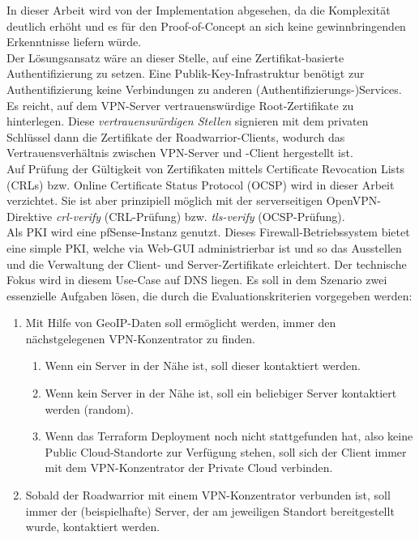 In dieser Arbeit wird von der Implementation abgesehen, da die Komplexität deutlich erhöht und es für den Proof-of-Concept an sich keine gewinnbringenden Erkenntnisse liefern würde.\\
Der Lösungsansatz wäre an dieser Stelle, auf eine Zertifikat-basierte Authentifizierung zu setzen. Eine Publik-Key-Infrastruktur benötigt zur Authentifizierung keine Verbindungen zu anderen (Authentifizierungs-)Services. Es reicht, auf dem VPN-Server vertrauenswürdige Root-Zertifikate zu hinterlegen. Diese \textit{vertrauenswürdigen Stellen} signieren mit dem privaten Schlüssel dann die Zertifikate der Roadwarrior-Clients, wodurch das Vertrauensverhältnis zwischen VPN-Server und -Client hergestellt ist.\\ 
Auf Prüfung der Gültigkeit von Zertifikaten mittels Certificate Revocation Lists (CRLs) bzw. Online Certificate Status Protocol (OCSP) wird in dieser Arbeit verzichtet. Sie ist aber prinzipiell möglich mit der serverseitigen OpenVPN-Direktive \textit{crl-verify} (CRL-Prüfung) bzw. \textit{tls-verify} (OCSP-Prüfung).\cite[S.116, S.325-327]{Keijser2011}\\
Als PKI wird eine pfSense-Instanz genutzt. Dieses Firewall-Betriebssystem bietet eine simple PKI, welche via Web-GUI administrierbar ist und so das Ausstellen und die Verwaltung der Client- und Server-Zertifikate erleichtert.\cite[S.376-383]{Netgate2020}
Der technische Fokus wird in diesem Use-Case auf DNS liegen. Es soll in dem Szenario zwei essenzielle Aufgaben lösen, die durch die Evaluationskriterien vorgegeben werden:\label{evalkriterien-uc2}
\begin{enumerate}
\item Mit Hilfe von GeoIP-Daten soll ermöglicht werden, immer den nächstgelegenen VPN-Konzentrator zu finden.\label{geoip-nearest-vpn}
\begin{enumerate}[label=(\alph*)]
    \item Wenn ein Server in der Nähe ist, soll dieser kontaktiert werden.\label{server-nearest}
    \item Wenn kein Server in der Nähe ist, soll ein beliebiger Server kontaktiert werden (random)\cite{bindrrset2020}.\label{no-server}
    \item Wenn das Terraform \gls{Deployment} noch nicht stattgefunden hat, also keine Public Cloud-Standorte zur Verfügung stehen, soll sich der Client immer mit dem VPN-Konzentrator der Private Cloud verbinden.\label{server-not-deployed}
\end{enumerate}
\item Sobald der Roadwarrior mit einem VPN-Konzentrator verbunden ist, soll immer der (beispielhafte) Server, der am jeweiligen Standort bereitgestellt wurde, kontaktiert werden.
\end{enumerate}

